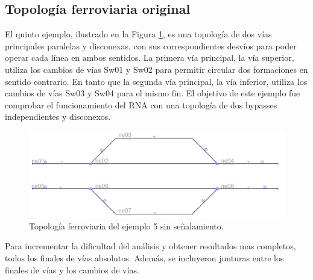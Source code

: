 \subsection{Topología ferroviaria original}

	El quinto ejemplo, ilustrado en la Figura \ref{fig:EJ5_1}, es una topología de dos vías principales paralelas y disconexas, con sus correspondientes desvíos para poder operar cada línea en ambos sentidos. La primera vía principal, la vía superior, utiliza los cambios de vías Sw01 y Sw02 para permitir circular dos formaciones en sentido contrario. En tanto que la segunda vía principal, la vía inferior, utiliza los cambios de vías Sw03 y Sw04 para el mismo fin. El objetivo de este ejemplo fue comprobar el funcionamiento del RNA con una topología de dos bypasses independientes y disconexos.
	
	\begin{figure}[h]
		\centering
		\includegraphics[width=1\textwidth]{resultados-obtenidos/ejemplo5/images/5_empty.png}
		\centering\caption{Topología ferroviaria del ejemplo 5 sin señalamiento.}
		\label{fig:EJ5_1}
	\end{figure}
	
	Para incrementar la dificultad del análisis y obtener resultados mas completos, todos los finales de vías absolutos. Además, se incluyeron junturas entre los finales de vías y los cambios de vías.
